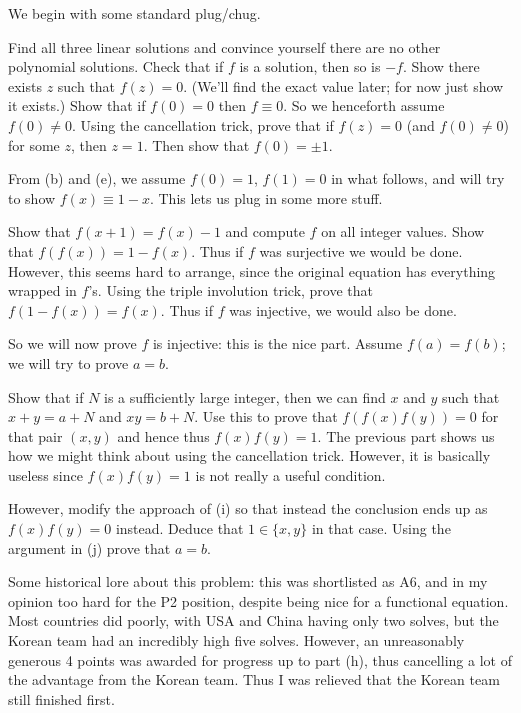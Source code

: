 We begin with some standard plug/chug.
\begin{walk}
  \ii Find all three linear solutions
  and convince yourself there are no other polynomial solutions.
  \ii Check that if $f$ is a solution, then so is $-f$.
  \ii Show there exists $z$ such that $f(z) = 0$.
  (We'll find the exact value later;
  for now just show it exists.)
  \ii Show that if $f(0) = 0$ then $f \equiv 0$.
  So we henceforth assume $f(0) \neq 0$.
  \ii Using the cancellation trick, prove that if $f(z) = 0$
  (and $f(0) \neq 0$) for some $z$, then $z = 1$.
  Then show that $f(0) = \pm 1$.
\end{walk}
From (b) and (e), we assume $f(0) = 1$, $f(1) = 0$ in what follows,
and will try to show $f(x) \equiv 1-x$.
This lets us plug in some more stuff.
\begin{walk}[resume]
  \ii Show that $f(x+1) = f(x)-1$
  and compute $f$ on all integer values.
  \ii Show that $f(f(x)) = 1-f(x)$.
  Thus if $f$ was surjective we would be done.
  However, this seems hard to arrange,
  since the original equation has everything wrapped in $f$'s.
  \ii Using the triple involution trick,
  prove that $f(1-f(x)) = f(x)$.
  Thus if $f$ was injective, we would also be done.
\end{walk}
So we will now prove $f$ is injective: this is the nice part.
Assume $f(a) = f(b)$; we will try to prove $a = b$.
\begin{walk}[resume]
  \ii Show that if $N$ is a sufficiently large integer,
  then we can find $x$ and $y$ such that $x+y = a+N$
  and $xy = b+N$.
  Use this to prove that $f(f(x) f(y)) = 0$ for that
  pair $(x,y)$ and hence
  thus $f(x) f(y) = 1$.
  \ii The previous part shows us how we might think
  about using the cancellation trick.
  However, it is basically useless since $f(x) f(y) = 1$
  is not really a useful condition.

  However, modify the approach of (i) so that
  instead the conclusion
  ends up as $f(x)f(y) = 0$ instead.
  Deduce that $1 \in \{x,y\}$ in that case.
  \ii Using the argument in (j) prove that $a = b$.
\end{walk}
Some historical lore about this problem:
this was shortlisted as A6,
and in my opinion too hard for the P2 position,
despite being nice for a functional equation.
Most countries did poorly, with USA and China having only two solves,
but the Korean team had an incredibly high five solves.
However, an unreasonably generous 4 points was awarded
for progress up to part (h),
thus cancelling a lot of the advantage from the Korean team.
Thus I was relieved that the Korean team still finished first.

